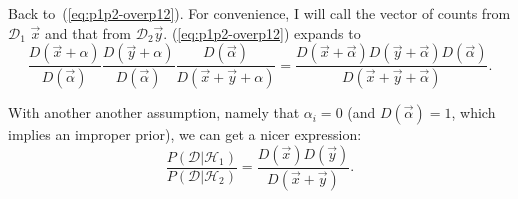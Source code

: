 \documentclass{article}
\begin{document}
Back to~(\ref{eq:p1p2-overp12}). For convenience, I will call the vector of
counts from $\mathcal{D}_1$ $\vec{x}$ and that from $\mathcal{D}_2 \vec{y}$.
(\ref{eq:p1p2-overp12}) expands to
\begin{equation}
\frac{D(\vec{x}+\alpha)}{D(\vec{\alpha})}
\frac{D(\vec{y}+\alpha)}{D(\vec{\alpha})}
\frac{D(\vec{\alpha})}{D(\vec{x}+\vec{y}+\alpha)} = \frac{D(\vec{x}+\vec{\alpha})D(\vec{y}+\vec\alpha)D(\vec\alpha)}{D(\vec{x}+\vec{y}+\vec\alpha)}.
\end{equation}

With another another assumption, namely that $\alpha_i = 0$ (and $D(\vec\alpha)
= 1$, which implies an improper prior), we can get a nicer expression:
\begin{equation}
\frac{P(\mathcal{D}|\mathcal{H}_1)}{P(\mathcal{D}|\mathcal{H}_2)} = \frac{D(\vec{x})D(\vec{y})}{D(\vec{x}+\vec{y})}.
\end{equation}
\end{document}
